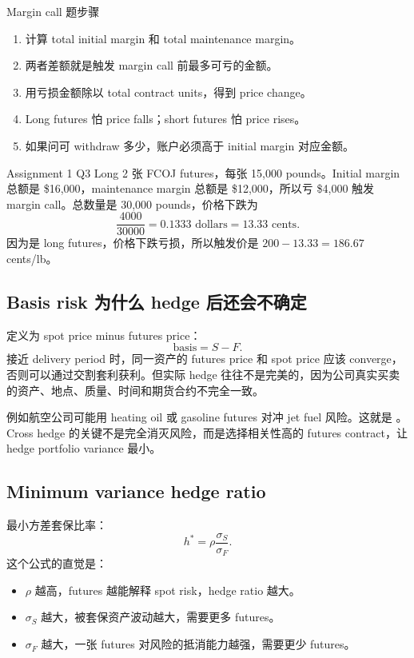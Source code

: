 \begin{workflowbox}{Margin call 题步骤}
\begin{enumerate}
  \item 计算 total initial margin 和 total maintenance margin。
  \item 两者差额就是触发 margin call 前最多可亏的金额。
  \item 用亏损金额除以 total contract units，得到 price change。
  \item Long futures 怕 price falls；short futures 怕 price rises。
  \item 如果问可 withdraw 多少，账户必须高于 initial margin 对应金额。
\end{enumerate}
\end{workflowbox}

\begin{examplebox}{Assignment 1 Q3}
Long 2 张 FCOJ futures，每张 15,000 pounds。Initial margin 总额是 \$16,000，maintenance margin 总额是 \$12,000，所以亏 \$4,000 触发 margin call。总数量是 30,000 pounds，价格下跌为
\[
\frac{4000}{30000}=0.1333\text{ dollars}=13.33\text{ cents}.
\]
因为是 long futures，价格下跌亏损，所以触发价是 $200-13.33=186.67$ cents/lb。
\end{examplebox}

\subsection{Basis risk 为什么 hedge 后还会不确定}
 定义为 spot price minus futures price：
\[
\text{basis}=S-F.
\]
接近 delivery period 时，同一资产的 futures price 和 spot price 应该 converge，否则可以通过交割套利获利。但实际 hedge 往往不是完美的，因为公司真实买卖的资产、地点、质量、时间和期货合约不完全一致。

例如航空公司可能用 heating oil 或 gasoline futures 对冲 jet fuel 风险。这就是 。Cross hedge 的关键不是完全消灭风险，而是选择相关性高的 futures contract，让 hedge portfolio variance 最小。

\subsection{Minimum variance hedge ratio}
最小方差套保比率：
\[
h^\ast=\rho\frac{\sigma_S}{\sigma_F}.
\]
这个公式的直觉是：
\begin{itemize}
  \item $\rho$ 越高，futures 越能解释 spot risk，hedge ratio 越大。
  \item $\sigma_S$ 越大，被套保资产波动越大，需要更多 futures。
  \item $\sigma_F$ 越大，一张 futures 对风险的抵消能力越强，需要更少 futures。
\end{itemize}

